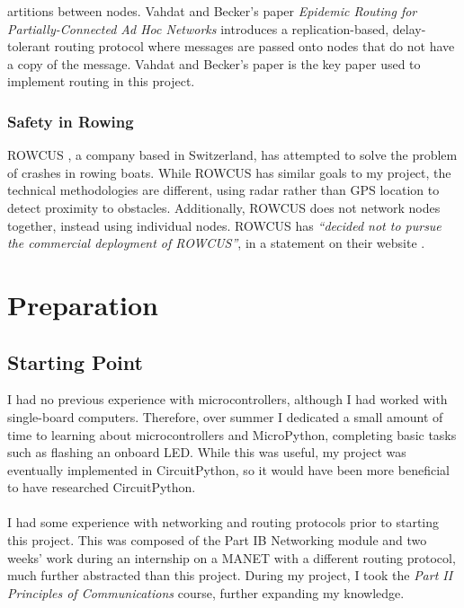 \documentclass[12pt,a4paper]{report}
\newcommand{\newchapter}[2]{
    \setcounter{chapter}{#1}
    \setcounter{section}{0}
    \chapter*{#2}
    \addcontentsline{toc}{chapter}{#1 #2}
}
\begin{document}
artitions between nodes. Vahdat and Becker's paper \emph{Epidemic Routing for Partially-Connected Ad Hoc Networks} \cite{epidemic} introduces a replication-based, delay-tolerant routing protocol where messages are passed onto nodes that do not have a copy of the message. Vahdat and Becker's paper is the key paper used to implement routing in this project. \\

\subsection{Safety in Rowing}
ROWCUS \cite{rowcus}, a company based in Switzerland, has attempted to solve the problem of crashes in rowing boats. While ROWCUS has similar goals to my project, the technical methodologies are different, using radar rather than GPS location to detect proximity to obstacles. Additionally, ROWCUS does not network nodes together, instead using individual nodes. ROWCUS has \emph{``decided not to pursue the commercial deployment of ROWCUS''}, in a statement on their website \cite{rowcus}. \\


\newchapter{2}{Preparation}
\setcounter{figure}{0}
\section{Starting Point} 
I had no previous experience with microcontrollers, although I had worked with single-board computers. Therefore, over summer I dedicated a small amount of time to learning about microcontrollers and MicroPython, completing basic tasks such as flashing an onboard LED. While this was useful, my project was eventually implemented in CircuitPython, so it would have been more beneficial to have researched CircuitPython. \\ \\
I had some experience with networking and routing protocols prior to starting this project. This was composed of the Part IB Networking module and two weeks' work during an internship on a MANET with a different routing protocol, much further abstracted than this project. During my project, I took the \emph{Part II Principles of Communications} course, further expanding my knowledge. \\
\end{document}
